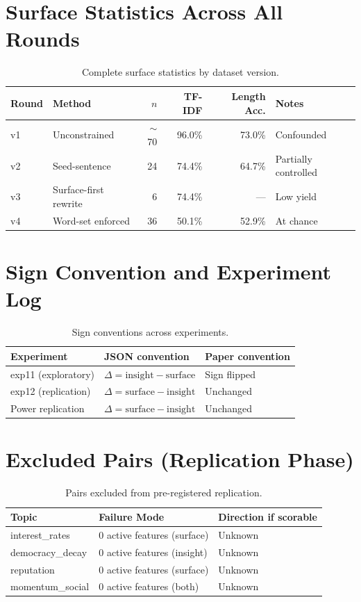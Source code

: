 \documentclass{article}
\begin{document}
\appendix

\section{Surface Statistics Across All Rounds}

\begin{table}[h]
\centering
\caption{Complete surface statistics by dataset version.}
\begin{tabular}{llrrrl}
\toprule
Round & Method & $n$ & TF-IDF & Length Acc. & Notes \\
\midrule
v1 & Unconstrained & $\sim$70 & 96.0\% & 73.0\% & Confounded \\
v2 & Seed-sentence & 24 & 74.4\% & 64.7\% & Partially controlled \\
v3 & Surface-first rewrite & 6 & 74.4\% & --- & Low yield \\
v4 & Word-set enforced & 36 & 50.1\% & 52.9\% & At chance \\
\bottomrule
\end{tabular}
\end{table}

\section{Sign Convention and Experiment Log}

\begin{table}[h]
\centering
\caption{Sign conventions across experiments.}
\begin{tabular}{lll}
\toprule
Experiment & JSON convention & Paper convention \\
\midrule
exp11 (exploratory) & $\Delta = \text{insight} - \text{surface}$ & Sign flipped \\
exp12 (replication) & $\Delta = \text{surface} - \text{insight}$ & Unchanged \\
Power replication & $\Delta = \text{surface} - \text{insight}$ & Unchanged \\
\bottomrule
\end{tabular}
\end{table}

\section{Excluded Pairs (Replication Phase)}

\begin{table}[h]
\centering
\caption{Pairs excluded from pre-registered replication.}
\begin{tabular}{lll}
\toprule
Topic & Failure Mode & Direction if scorable \\
\midrule
interest\_rates & 0 active features (surface) & Unknown \\
democracy\_decay & 0 active features (insight) & Unknown \\
reputation & 0 active features (surface) & Unknown \\
momentum\_social & 0 active features (both) & Unknown \\
\bottomrule
\end{tabular}
\end{table}
\end{document}
